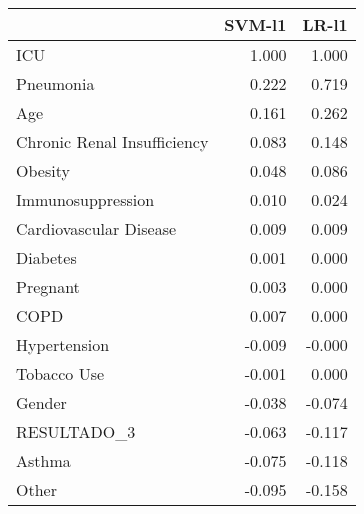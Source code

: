\begin{tabular}{lrr}
\toprule
{} &  SVM-l1 &  LR-l1 \\
\midrule
ICU                         &   1.000 &  1.000 \\
Pneumonia                   &   0.222 &  0.719 \\
Age                         &   0.161 &  0.262 \\
Chronic Renal Insufficiency &   0.083 &  0.148 \\
Obesity                     &   0.048 &  0.086 \\
Immunosuppression           &   0.010 &  0.024 \\
Cardiovascular Disease      &   0.009 &  0.009 \\
Diabetes                    &   0.001 &  0.000 \\
Pregnant                    &   0.003 &  0.000 \\
COPD                        &   0.007 &  0.000 \\
Hypertension                &  -0.009 & -0.000 \\
Tobacco Use                 &  -0.001 &  0.000 \\
Gender                      &  -0.038 & -0.074 \\
RESULTADO\_3                 &  -0.063 & -0.117 \\
Asthma                      &  -0.075 & -0.118 \\
Other                       &  -0.095 & -0.158 \\
\bottomrule
\end{tabular}

